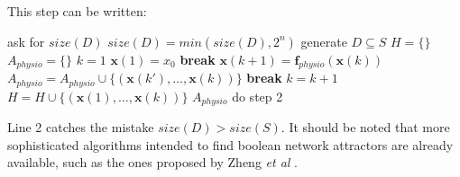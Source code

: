 \documentclass[oneside,a4paper,onecolumn,notitlepage]{article}
\begin{document}
This step can be written:
\begin{algorithmic}[1]
\STATE ask for $size(D)$
\STATE $size(D)=min(size(D),2^n)$
\STATE generate $D\subseteq S$
\STATE $H=\lbrace \rbrace$
\STATE $A_{physio}=\lbrace \rbrace$
    \STATE $k=1$
    \STATE $\boldsymbol{x}(1)=x_0$
            \STATE \textbf{break}
        \ENDIF
        \STATE $\boldsymbol{x}(k+1)=\boldsymbol{f}_{physio}(\boldsymbol{x}(k))$
            \STATE $A_{physio}=A_{physio}\cup \lbrace (\boldsymbol{x}(k'),\dots ,\boldsymbol{x}(k))\rbrace$
            \STATE \textbf{break}
        \ENDIF
        \STATE $k=k+1$
    \ENDWHILE
    \STATE $H=H\cup \lbrace (\boldsymbol{x}(1),\dots ,\boldsymbol{x}(k))\rbrace$
\ENDFOR
\RETURN $A_{physio}$
\STATE do step 2
\end{algorithmic}
Line 2 catches the mistake $size(D)>size(S)$. It should be noted that more sophisticated algorithms intended to find boolean network attractors are already available, such as the ones proposed by Zheng \textit{et al} \cite{zheng2013efficient}.
\end{document}
